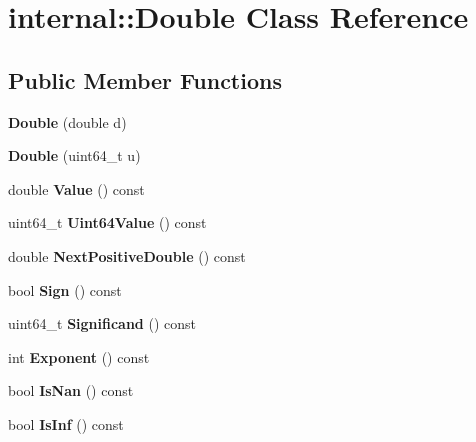 \hypertarget{a02256}{}\section{internal\+:\+:Double Class Reference}
\label{a02256}
\subsection*{Public Member Functions}
\begin{DoxyCompactItemize}
\item 
\mbox{\label{a02256_ad66f3b914570ce62e9f16083117f3e4f}} 
{\bfseries Double} (double d)
\item 
\mbox{\label{a02256_a293a7ca841d847ea3e83ffa28b68601f}} 
{\bfseries Double} (uint64\+\_\+t u)
\item 
\mbox{\label{a02256_a665c64824d1046528cbc4066a9ed0ef8}} 
double {\bfseries Value} () const
\item 
\mbox{\label{a02256_a1a35be6344c886f159cb36a1498a62ac}} 
uint64\+\_\+t {\bfseries Uint64\+Value} () const
\item 
\mbox{\label{a02256_a6ffee23d82d9c606b1a53ed87e393e90}} 
double {\bfseries Next\+Positive\+Double} () const
\item 
\mbox{\label{a02256_ab09c26873ca4c3e471a97c4559bf317d}} 
bool {\bfseries Sign} () const
\item 
\mbox{\label{a02256_ade5d3e893dd6884ccd37632109dae1a6}} 
uint64\+\_\+t {\bfseries Significand} () const
\item 
\mbox{\label{a02256_ae091055d96d8730f654170613f2cf265}} 
int {\bfseries Exponent} () const
\item 
\mbox{\label{a02256_a312312ab2798ee85cbd0e739fcefa386}} 
bool {\bfseries Is\+Nan} () const
\item 
\mbox{\label{a02256_afe1ce48f7fb9797e1a2044c58a6b226c}} 
bool {\bfseries Is\+Inf} () const
\item 
\mbox{\label{a02256_a8b9a82e8b99783b7e98b5307756021c0}} 

\end{DoxyCompactItemize}
